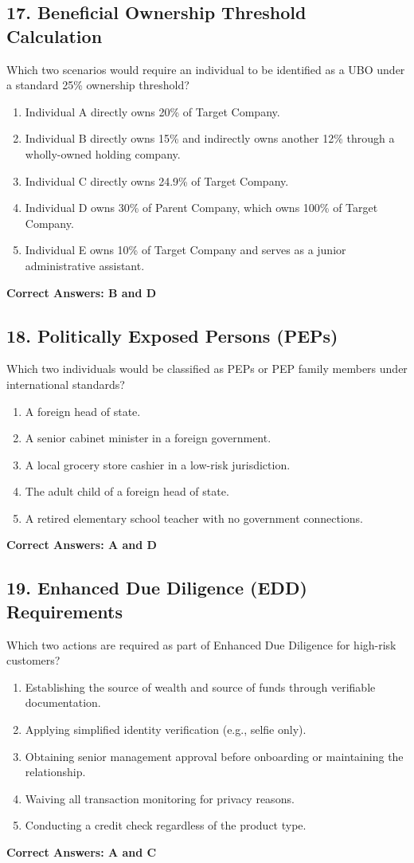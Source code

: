 \documentclass[11pt,a4paper]{article}
\begin{document}
	\subsection{17. Beneficial Ownership Threshold Calculation}
	Which two scenarios would require an individual to be identified as a UBO under a standard 25\% ownership threshold?
	\begin{enumerate}[label=\Alph*.]
		\item Individual A directly owns 20\% of Target Company.
		\item Individual B directly owns 15\% and indirectly owns another 12\% through a wholly-owned holding company.
		\item Individual C directly owns 24.9\% of Target Company.
		\item Individual D owns 30\% of Parent Company, which owns 100\% of Target Company.
		\item Individual E owns 10\% of Target Company and serves as a junior administrative assistant.
	\end{enumerate}
	\textbf{Correct Answers: B and D}
	
	\subsection{18. Politically Exposed Persons (PEPs)}
	Which two individuals would be classified as PEPs or PEP family members under international standards?
	\begin{enumerate}[label=\Alph*.]
		\item A foreign head of state.
		\item A senior cabinet minister in a foreign government.
		\item A local grocery store cashier in a low-risk jurisdiction.
		\item The adult child of a foreign head of state.
		\item A retired elementary school teacher with no government connections.
	\end{enumerate}
	\textbf{Correct Answers: A and D}
	
	\subsection{19. Enhanced Due Diligence (EDD) Requirements}
	Which two actions are required as part of Enhanced Due Diligence for high-risk customers?
	\begin{enumerate}[label=\Alph*.]
		\item Establishing the source of wealth and source of funds through verifiable documentation.
		\item Applying simplified identity verification (e.g., selfie only).
		\item Obtaining senior management approval before onboarding or maintaining the relationship.
		\item Waiving all transaction monitoring for privacy reasons.
		\item Conducting a credit check regardless of the product type.
	\end{enumerate}
	\textbf{Correct Answers: A and C}
	
\end{document}
